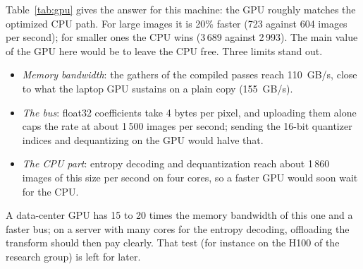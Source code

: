 Table~\ref{tab:gpu} gives the answer for this machine: the GPU roughly matches the optimized CPU
path. For large images it is 20\% faster (723 against 604 images per second); for smaller ones
the CPU wins (3\,689 against 2\,993). The main value of the GPU here would be to leave the CPU
free. Three limits stand out.
\begin{itemize}
  \item \emph{Memory bandwidth}: the gathers of the compiled passes reach 110~GB/s, close to what
    the laptop GPU sustains on a plain copy (155~GB/s).
  \item \emph{The bus}: float32 coefficients take 4 bytes per pixel, and uploading them alone
    caps the rate at about 1\,500 images per second; sending the 16-bit quantizer indices and
    dequantizing on the GPU would halve that.
  \item \emph{The CPU part}: entropy decoding and dequantization reach about 1\,860 images of this
    size per second on four cores, so a faster GPU would soon wait for the CPU.
\end{itemize}
A data-center GPU has 15 to 20 times the memory bandwidth of this one and a faster bus; on a
server with many cores for the entropy decoding, offloading the transform should then pay
clearly. That test (for instance on the H100 of the research group) is left for later.
